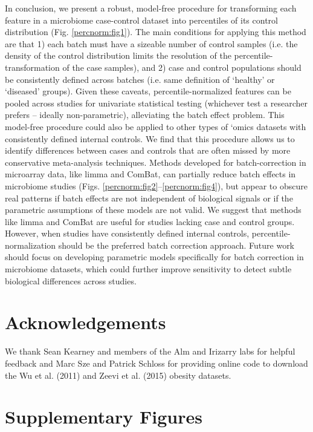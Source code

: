 In conclusion, we present a robust, model-free procedure for transforming each feature in a microbiome case-control dataset into percentiles of its control distribution (Fig. \ref{percnorm:fig1}).
The main conditions for applying this method are that 1) each batch must have a sizeable number of control samples (i.e. the density of the control distribution limits the resolution of the percentile-transformation of the case samples), and 2) case and control populations should be consistently defined across batches (i.e. same definition of `healthy' or `diseased' groups).
Given these caveats, percentile-normalized features can be pooled across studies for univariate statistical testing (whichever test a researcher prefers -- ideally non-parametric), alleviating the batch effect problem.
This model-free procedure could also be applied to other types of `omics datasets with consistently defined internal controls.
We find that this procedure allows us to identify differences between cases and controls that are often missed by more conservative meta-analysis techniques.
Methods developed for batch-correction in microarray data, like limma and ComBat, can partially reduce batch effects in microbiome studies (Figs. \ref{percnorm:fig2}--\ref{percnorm:fig4}), but appear to obscure real patterns if batch effects are not independent of biological signals or if the parametric assumptions of these models are not valid.
We suggest that methods like limma and ComBat are useful for studies lacking case and control groups.
However, when studies have consistently defined internal controls, percentile-normalization should be the preferred batch correction approach.
Future work should focus on developing parametric models specifically for batch correction in microbiome datasets, which could further improve sensitivity to detect subtle biological differences across studies.

\section{Acknowledgements}

We thank Sean Kearney and members of the Alm and Irizarry labs for helpful feedback and Marc Sze and Patrick Schloss for providing online code to download the Wu et al. (2011) and Zeevi et al. (2015) obesity datasets.

\section{Supplementary Figures}

